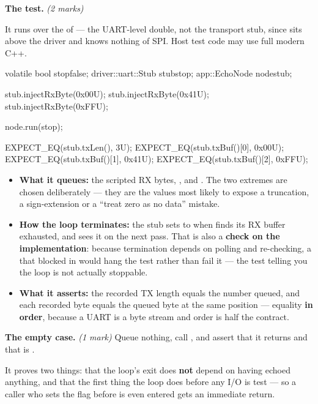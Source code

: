 \textbf{The test.} \textit{(2 marks)}

It runs over the \textbf{} of  --- the UART-level double, not the
transport stub, since  sits above the driver and knows nothing of SPI. Host test code
may use full modern C++.

\begin{cppcode}
volatile bool stop{false};
driver::uart::Stub stub{stop};
app::EchoNode node{stub};

stub.injectRxByte(0x00U);
stub.injectRxByte(0x41U);
stub.injectRxByte(0xFFU);

node.run(stop);

EXPECT_EQ(stub.txLen(), 3U);
EXPECT_EQ(stub.txBuf()[0], 0x00U);
EXPECT_EQ(stub.txBuf()[1], 0x41U);
EXPECT_EQ(stub.txBuf()[2], 0xFFU);
\end{cppcode}

\begin{itemize}
  \item \textbf{What it queues:} the scripted RX bytes, ,  and . The
    two extremes are chosen deliberately --- they are the values most likely to expose a truncation,
    a sign-extension or a ``treat zero as no data'' mistake.
  \item \textbf{How the loop terminates:} the stub sets  to  when 
    finds its RX buffer exhausted, and  sees it on the next pass. That is also a
    \textbf{check on the implementation}: because termination depends on  polling and
    re-checking, a  that blocked in  would hang the test rather than
    fail it --- the test telling you the loop is not actually stoppable.
  \item \textbf{What it asserts:} the recorded TX length equals the number queued, and each recorded
    byte equals the queued byte at the same position --- equality \textbf{in order}, because a UART
    is a byte stream and order is half the contract.
\end{itemize}

\textbf{The empty case.} \textit{(1 mark)} Queue nothing, call , and assert that it
returns and that  is .

It proves two things: that the loop's exit does \textbf{not} depend on having echoed anything, and
that the first thing the loop does before any I/O is test  --- so a caller who sets the
flag before  is even entered gets an immediate return.

